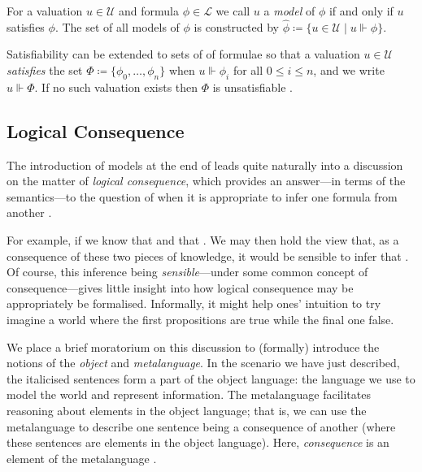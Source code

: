 \begin{definition} 
  \label{definition:model}
  For a valuation $u \in \mathcal{U}$ and formula $\phi \in \mathcal{L}$ we call $u$ a \textit{model} of $\phi$ if and only if $u$ satisfies $\phi$. The set of all models of $\phi$ is constructed by $\hat{\phi} \coloneqq \{u \in \mathcal{U} \mid u \Vdash \phi \}$.
\end{definition}

Satisfiability can be extended to sets of of formulae so that a valuation $u \in \mathcal{U}$ \textit{satisfies} the set $\Phi \coloneqq \{\phi_0, \ldots, \phi_n \}$ when $u \Vdash \phi_i$ for all $0 \leq i \leq n$, and we write $u \Vdash \Phi$. If no such valuation exists then $\Phi$ is unsatisfiable \cite[p. 31]{Ben1993Mathematical}. 

\subsection{Logical Consequence}
\label{subsection:logical-consequence}

The introduction of models at the end of  leads quite naturally into a discussion on the matter of \textit{logical consequence}, which provides an answer---in terms of the semantics---to the question of when it is appropriate to infer one formula from another  \cite[p. 408]{tarski1936consequence}.  

For example, if we know that  and that . We may then hold the view that, as a consequence of these two pieces of knowledge, it would be sensible to infer that . Of course, this inference being \textit{sensible}---under some common concept of consequence---gives little insight into how logical consequence may be appropriately be formalised. Informally, it might help ones' intuition to try imagine a world where the first propositions are true while the final one false. 

 
We place a brief moratorium on this discussion to (formally) introduce the notions of the \textit{object} and \textit{metalanguage}. In the scenario we have just described, the italicised sentences form a part of the object language: the language we use to model the world and represent information. The metalanguage facilitates reasoning about elements in the object language; that is, we can use the metalanguage to describe one sentence being a consequence of another (where these sentences are elements in the object language). Here, \textit{consequence} is an element of the metalanguage \cite[p 22]{Ben1993Mathematical}.

